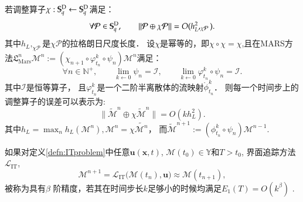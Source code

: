 \begin{lem}\label{lem:ADJerror}
	若调整算子$\chi:\mathbb{S}_q^{\textup{D}}\leftarrow\mathbb{S}_q^{\textup{D}}$满足：
	\begin{equation*}
	\forall \mathcal{P}\in\mathbb{S}_q^{\textup{D}},\qquad \|\mathcal{P}\oplus \chi\mathcal{P}\|=O(h_L^2,_{\chi\mathcal{P}}).
	\end{equation*}
	其中$h_L,_{\chi\mathcal{P}}$是$\chi\mathcal{P}$的拉格朗日尺度长度．
	设$\chi$是幂等的，即$\chi\circ\chi=\chi$,且在MARS方法${\mathfrak L}_{\mathrm{Mars}}^n {\mathcal M}^n:= \left(\chi_{n+1}\circ\varphi_{t_n}^k\circ\psi_n
	\right){\mathcal M}^n$满足：
	\begin{equation*}
	\forall n\in \mathbb{N}^+,\qquad \lim_{k\leftarrow0}\psi _n=\mathcal{I},
	\qquad\lim_{k\leftarrow0}\varphi_{t_n}^k\circ\psi_n=\mathcal{I}.
	\end{equation*}
	其中$\mathcal{I}$是恒等算子，
	且$\varphi_{t_n}^k$是一个二阶半离散体的流映射$\mathring{ \phi}_{t_n}^k$．
	则每一个时间步上的调整算子的误差可以表示为:
	\begin{equation*}
	\|\widetilde{\mathcal{M}}^n\oplus\chi\widetilde{\mathcal{M}}^n \|=O(kh_L^2).
	\end{equation*}
	其中$h_L=\max_n h_L(\mathcal{M}^n),\mathcal{M}^n=\chi\widetilde{\mathcal{M}^n}$， 而$\widetilde{\mathcal{M}}^{n+1}:=(\phi_{t_n}^k\circ\psi_n)\mathcal{M}^{n-1}$.
\end{lem}

\begin{defn}
	\label{defn:accuracy}
	如果对定义\ref{defn:ITproblem}中任意$\mathbf{u}(\mathbf{x},t)$, $\mathcal{M}(t_0)\in\mathbb{Y}$和$T>t_0$, 
	界面追踪方法$\mathcal{L}_{\mathrm{IT}}$,
	\begin{equation*}
	\mathcal{M}^{n+1}
	= \mathcal{L}_{\mathrm{IT}}\bigl(\mathcal{M}(t_n), \mathbf{u}\bigr)
	\approx  \mathcal{M}(t_{n+1}),
	\end{equation*}
	被称为具有$\beta$ 阶精度，若其在时间步长$k$足够小的时候均满足$E_1(T)=O(k^{\beta})$ .
\end{defn}